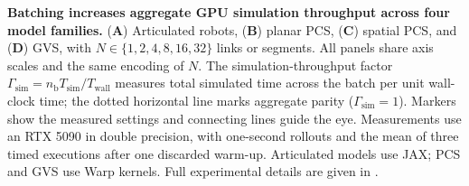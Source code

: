 \caption{\textbf{Batching increases aggregate GPU simulation throughput across four model families.}
(\textbf{A}) Articulated robots, (\textbf{B}) planar PCS, (\textbf{C}) spatial PCS, and (\textbf{D}) GVS, with $N\in\{1,2,4,8,16,32\}$ links or segments. All panels share axis scales and the same encoding of $N$. The simulation-throughput factor $\Gamma_\mathrm{sim}=n_\mathrm{b}T_\mathrm{sim}/T_\mathrm{wall}$ measures total simulated time across the batch per unit wall-clock time; the dotted horizontal line marks aggregate parity ($\Gamma_\mathrm{sim}=1$). Markers show the measured settings and connecting lines guide the eye. Measurements use an RTX 5090 in double precision, with one-second rollouts and the mean of three timed executions after one discarded warm-up. Articulated models use JAX; PCS and GVS use Warp kernels. Full experimental details are given in .}
